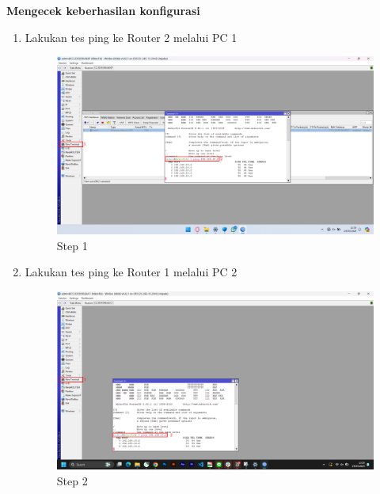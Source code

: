 \begin{center}
	\textbf{Mengecek keberhasilan konfigurasi}
	\begin{enumerate}
		\item Lakukan tes ping ke Router 2 melalui PC 1
		\begin{figure}[H]
			\centering
			\includegraphics[width=0.9\linewidth]{P2/img/per1/pc1/Step 4.png}
			\caption{Step 1}
			\label{fig:Ping Step 1(Per.1 PC1)}
		\end{figure}
		\item Lakukan tes ping ke Router 1 melalui PC 2
		\begin{figure}[H]
			\centering
			\includegraphics[width=0.9\linewidth]{P2/img/per1/pc2/Step 4.png}
			\caption{Step 2}
			\label{fig:Ping Step 2(Per.1 PC2)}
		\end{figure}
	\end{enumerate}
\end{center}

